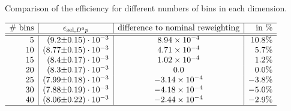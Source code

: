  
\begin{table}[hptb]
    \centering
    \caption{Comparison of the efficiency \effSelDp for different numbers of bins in each dimension.}
    \label{tab:systematic_effD0p_nbins}
    $\begin{array}{r|r@{\pm}l|c|r}
    \hline
    \text{\# bins}  & \multicolumn{2}{c|}{\effSelDp}  & \text{difference to nominal reweighting} & \text{in \%} \\ \hline \hline
5 & (9.2 & 0.15) \cdot 10^{-3} & \num[round-mode=figures, round-precision=3]{0.000893867513509} & 10.8\%\\ 10 & (8.77 & 0.15) \cdot 10^{-3} & \num[round-mode=figures, round-precision=3]{0.000471373232304} & 5.7\%\\ 15 & (8.4 & 0.17) \cdot 10^{-3} & \num[round-mode=figures, round-precision=3]{0.000101756679921} & 1.2\%\\ 20 & (8.3 & 0.17) \cdot 10^{-3} & \num[round-mode=figures, round-precision=3]{0.0} & 0.0\%\\ 25 & (7.99 & 0.18) \cdot 10^{-3} & \num[round-mode=figures, round-precision=3]{-0.000313870153072} & -3.8\%\\ 30 & (7.88 & 0.19) \cdot 10^{-3} & \num[round-mode=figures, round-precision=3]{-0.000418015648779} & -5.0\%\\ 40 & (8.06 & 0.22) \cdot 10^{-3} & \num[round-mode=figures, round-precision=3]{-0.000243686560501} & -2.9\%\\ 
    \hline
    \end{array}$
\end{table}
